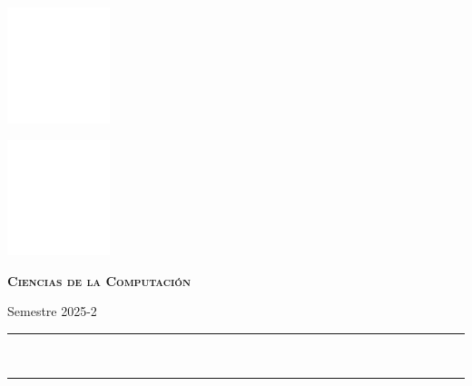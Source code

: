 \rmfamily
\begin{center}
    \begin{minipage}{3.5cm}
    	\begin{center}
	    \includegraphics[width=3cm]{resources/Logo_UNAM_B.png}
    	\end{center}
    \end{minipage}\hfill
    \begin{minipage}{9cm}
    	
    \end{minipage}\hfill
    \begin{minipage}{3.5cm}
    	\begin{center}
    	\includegraphics[width=3cm]{resources/Logo_FC_B.png}
    	\end{center}
    \end{minipage}
    
    \vspace{0.5cm}
    {\LARGE
    \color{Naranja}
    \bfseries
    \scshape
        \Universidad
    }
    
    {\huge
    \color{Rosa}
    \bfseries
    \scshape
        \Facultad
    }
    
    {\LARGE
    \color{Purpura}
    \bfseries
    \scshape
        Ciencias de la Computación

        Semestre 2025-2
    }
    
    \vspace{0.5cm}
    {\LARGE
    \color{Verde}
    \bfseries
    \scshape
        \materia
    }
    
    \vfill
    \rule{\linewidth}{0.5mm}\\[0.4cm]
    {\Huge
    \color{Cian}
    \bfseries
    \scshape
        \tit
    }
    \rule{\linewidth}{0.5mm}\\


\end{center}

